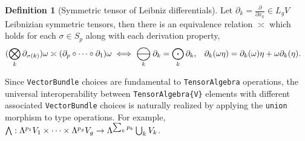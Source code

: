 \documentclass[]{article}
\theoremstyle{definition}
\newtheorem{definition}{Definition}
\theoremstyle{remark}
\DeclareMathOperator*{\bigominus}{\scalerel*{\ominus}{\bigodot}}
\begin{document}
\begin{definition}[Symmetric tensor of Leibniz differentials]
	Let $\partial_k = \frac\partial{\partial x_k}\in L_gV\,$ Leibnizian symmetric tensors, then there is an equivalence relation $\asymp$ which holds for each $\sigma\in S_p$ along with each derivation property,
	\begin{align*}
		(\bigotimes_k \partial_{\sigma(k)})\omega &\asymp (\partial_p \circ \dots\circ  \partial_1)\omega \iff \bigominus_k\partial_k = \bigodot_k\partial_k, & \partial_k(\omega\eta) &= \partial_k(\omega)\eta + \omega\partial_k(\eta).
	\end{align*}
\end{definition}




Since \verb`VectorBundle` choices are fundamental to \verb`TensorAlgebra` operations, the universal interoperability between \verb`TensorAlgebra{V}` elements with different associated \verb`VectorBundle` choices is naturally realized by applying the \verb`union` morphism to type operations.
For example, $\bigwedge :\Lambda^{p_1}V_1\times\dots\times\Lambda^{p_g}V_g \rightarrow \Lambda^{\sum_kp_k}\bigcup_k V_k$. 
\end{document}

